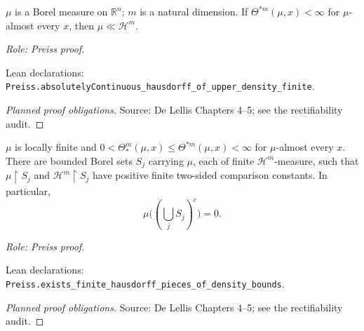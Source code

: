\begin{lemma}
\label{lem:absolute-continuity}







\(\mu\) is a Borel measure on \(\mathbb R^n\); \(m\) is a natural dimension.
If \(\Theta^{*m}(\mu,x)<\infty\) for \(\mu\)-almost every \(x\), then \(\mu\ll\mathcal H^m\).
\par\emph{Role: Preiss proof.}
\par Lean declarations: \texttt{Preiss.absolutelyContinuous\_hausdorff\_of\_upper\_density\_finite}.
\end{lemma}
\begin{proof}[Planned proof obligations]

\par Source: De Lellis Chapters 4--5; see the rectifiability audit.
\end{proof}

\begin{lemma}
\label{lem:finite-pieces}







\(\mu\) is locally finite and \(0<\Theta_*^m(\mu,x)\leq\Theta^{*m}(\mu,x)<\infty\) for \(\mu\)-almost every \(x\).
There are bounded Borel sets \(S_j\) carrying \(\mu\), each of finite \(\mathcal H^m\)-measure, such that \(\mu\!\restriction S_j\) and \(\mathcal H^m\!\restriction S_j\) have positive finite two-sided comparison constants. In particular,
\[
 \mu\bigl((\bigcup_j S_j)^c\bigr)=0.
\]
\par\emph{Role: Preiss proof.}
\par Lean declarations: \texttt{Preiss.exists\_finite\_hausdorff\_pieces\_of\_density\_bounds}.
\end{lemma}
\begin{proof}[Planned proof obligations]

\par Source: De Lellis Chapters 4--5; see the rectifiability audit.
\end{proof}


